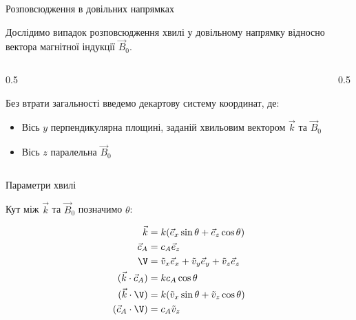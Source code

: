 \documentclass[]{beamer}
\begin{document}
\begin{frame}{Розповсюдження в довільних напрямках}
\begin{block}{}\justifying
    Дослідимо випадок розповсюдження хвилі у довільному напрямку відносно вектора магнітної індукції $\vec{B}_0$.
\end{block}
\begin{columns}
	\begin{column}{0.5\linewidth}


\medskip
Без втрати загальності введемо декартову систему координат, де:
\begin{itemize}
\item Вісь $y$ перпендикулярна площині, заданій хвильовим вектором $\vec{k}$ та $\vec{B}_0$
\item Вісь $z$ паралельна $\vec{B}_0$
\end{itemize}
	\end{column}
	\begin{column}{0.5\linewidth}
        
	\end{column}
\end{columns}


\end{frame}

\begin{frame}{Параметри хвилі}

Кут між $\vec{k}$ та $\vec{B}_0$ позначимо $\theta$:

\begin{align*}
\vec{k} &= k(\vec{e}_x \sin \theta + \vec{e}_z \cos \theta) \\
\vec{c}_A &= c_A \vec{e}_z  \\
\V &= \tilde{v}_{x} \vec{e}_x + \tilde{v}_{y} \vec{e}_y + \tilde{v}_{z} \vec{e}_z  \\
(\vec{k} \cdot \vec{c}_A) &= kc_A \cos \theta  \\
(\vec{k} \cdot \V) &= k(\tilde{v}_{x} \sin \theta + \tilde{v}_{z} \cos \theta) \\
(\vec{c}_A \cdot \V) &= c_A \tilde{v}_{z}
\end{align*}
\end{frame}
\end{document}
